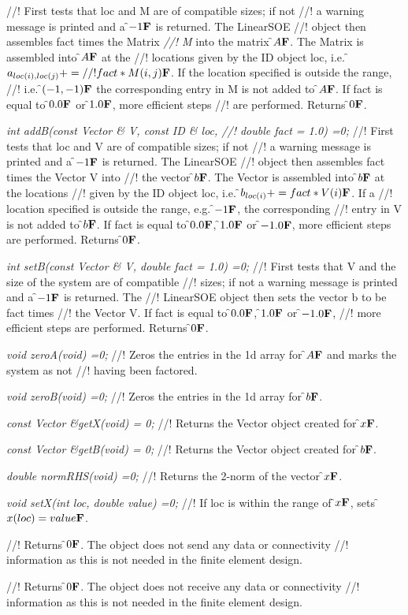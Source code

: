 //! First tests that \p loc and \p M are of compatible sizes; if not
//! a warning message is printed and a \f$-1{\bf F}$ is returned. The LinearSOE
//! object then assembles \p fact times the Matrix {\em 
//! M} into the matrix \f$A{\bf F}$. The Matrix is assembled into \f$A{\bf F}$ at the
//! locations given by the ID object \p loc, i.e. \f$a_{loc(i),loc(j)} +=
//! fact * M(i,j){\bf F}$. If the location specified is outside the range,
//! i.e. \f$(-1,-1){\bf F}$ the corresponding entry in \p M is not added to
\f$A{\bf F}$. If \p fact is equal to \f$0.0{\bf F}$ or \f$1.0{\bf F}$, more efficient steps
//! are performed. Returns \f$0{\bf F}$.


{\em int addB(const Vector \& V, const ID \& loc,
//! double fact = 1.0) =0;}
//! First tests that \p loc and \p V are of compatible sizes; if not
//! a warning message is printed and a \f$-1{\bf F}$ is returned. The LinearSOE
//! object then assembles \p fact times the Vector \p V into
//! the vector \f$b{\bf F}$. The Vector is assembled into \f$b{\bf F}$ at the locations
//! given by the ID object \p loc, i.e. \f$b_{loc(i)} += fact * V(i){\bf F}$. If a
//! location specified is outside the range, e.g. \f$-1{\bf F}$, the corresponding
//! entry in \p V is not added to \f$b{\bf F}$. If \p fact is equal to \f$0.0{\bf F}$,
\f$1.0{\bf F}$ or \f$-1.0{\bf F}$, more efficient steps are performed. Returns \f$0{\bf F}$.


{\em int setB(const Vector \& V, double fact = 1.0) =0;}
//! First tests that \p V and the size of the system are of compatible
//! sizes; if not a warning message is printed and a \f$-1{\bf F}$ is returned. The
//! LinearSOE object then sets the vector \p b to be \p fact times
//! the Vector \p V. If \p fact is equal to \f$0.0{\bf F}$, \f$1.0{\bf F}$ or \f$-1.0{\bf F}$,
//! more efficient steps are performed. Returns \f$0{\bf F}$. 

{\em void zeroA(void) =0;}
//! Zeros the entries in the 1d array for \f$A{\bf F}$ and marks the system as not
//! having been factored.

{\em void zeroB(void) =0;}
//! Zeros the entries in the 1d array for \f$b{\bf F}$.

{\em const Vector \&getX(void) = 0;}
//! Returns the Vector object created for \f$x{\bf F}$.

{\em const Vector \&getB(void) = 0;}
//! Returns the Vector object created for \f$b{\bf F}$.

{\em double normRHS(void) =0;}
//! Returns the 2-norm of the vector \f$x{\bf F}$.

{\em void setX(int loc, double value) =0;}
//! If \p loc is within the range of \f$x{\bf F}$, sets \f$x(loc) = value{\bf F}$.

//! Returns \f$0{\bf F}$. The object does not send any data or connectivity
//! information as this is not needed in the finite element design.

//! Returns \f$0{\bf F}$. The object does not receive any data or connectivity
//! information as this is not needed in the finite element design.
